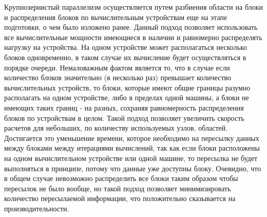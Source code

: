 \documentclass[a4paper, 14pt]{article}
\theoremstyle{definition}
\begin{document}
\par Крупнозернистый параллелизм осуществляется путем разбиения области на блоки и распределения блоков по вычислительным устройствам еще на этапе подготовки, о чем было изложено ранее. Данный подход позволяет использовать все вычислительные мощности имеющиеся в наличии и равномерно распределять нагрузку на устройства. На одном устройстве может располагаться несколько блоков одновременно, в таком случае их вычисление будет осуществляться в порядке очереди. Немаловажным фактом является то, что в случае если количество блоков значительно (в несколько раз) превышает количество вычислительных устройств, то блоки, которые имеют общие границы разумно располагать на одном устройстве, либо в пределах одной машины, а блоки не имеющих таких границ - на разных, сохраняя равномерность распределения блоков по устройствам в целом. Такой подход позволяет увеличить скорость расчетов для небольших, по количеству используемых узлов, областей. Достигается это уменьшение времени, которое необходимо на пересылку данных между блоками между итерациями вычислений, так как если блоки расположены на одном вычислительном устройстве или одной машине, то пересылка не будет выполняться в принципе, потому что данные уже доступны блоку. Очевидно, что в общем случае невозможно распределить все блоки таким образом чтобы пересылок не было вообще, но такой подход позволяет минимизировать количество пересылаемой информации, что положительно сказывается на производительности.



\par 
\end{document}
